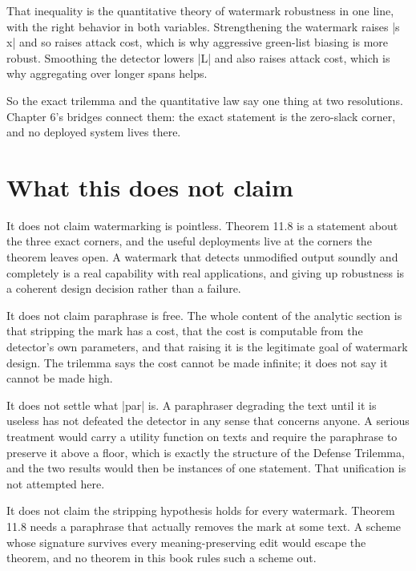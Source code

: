 \documentclass{memoir}
\begin{document}
That inequality is the quantitative theory of watermark robustness in one line,
with the right behavior in both variables. Strengthening the watermark raises \LeanVerb|s x|
and so raises attack cost, which is why aggressive green-list biasing is more
robust. Smoothing the detector lowers \LeanVerb|L| and also raises attack cost, which is
why aggregating over longer spans helps.

So the exact trilemma and the quantitative law say one thing at two resolutions.
Chapter 6's bridges connect them: the exact statement is the zero-slack corner,
and no deployed system lives there.



\section{What this does not claim}\label{Two--Schemas--of--Impossibility-005F-005F-005F--Machine--Checked--Limits--of--Trustworthy--Machine--Learning-005F-005F-005F--and--Why--They--Tighten--with--Capability----Watermarks-005F-005F-005F--Paraphrase-005F-005F-005F--and--the--Third--Corner----What--this--does--not--claim}

It does not claim watermarking is pointless. Theorem 11.8 is a statement about
the three exact corners, and the useful deployments live at the corners the
theorem leaves open. A watermark that detects unmodified output soundly and
completely is a real capability with real applications, and giving up robustness
is a coherent design decision rather than a failure.

It does not claim paraphrase is free. The whole content of the analytic section
is that stripping the mark has a cost, that the cost is computable from the
detector's own parameters, and that raising it is the legitimate goal of
watermark design. The trilemma says the cost cannot be made infinite; it does
not say it cannot be made high.

It does not settle what \LeanVerb|par| is. A paraphraser degrading the text until it is
useless has not defeated the detector in any sense that concerns anyone. A
serious treatment would carry a utility function on texts and require the
paraphrase to preserve it above a floor, which is exactly the structure of the
Defense Trilemma, and the two results would then be instances of one statement.
That unification is not attempted here.

It does not claim the stripping hypothesis holds for every watermark. Theorem
11.8 needs a paraphrase that actually removes the mark at some text. A scheme
whose signature survives every meaning-preserving edit would escape the theorem,
and no theorem in this book rules such a scheme out.
\end{document}
